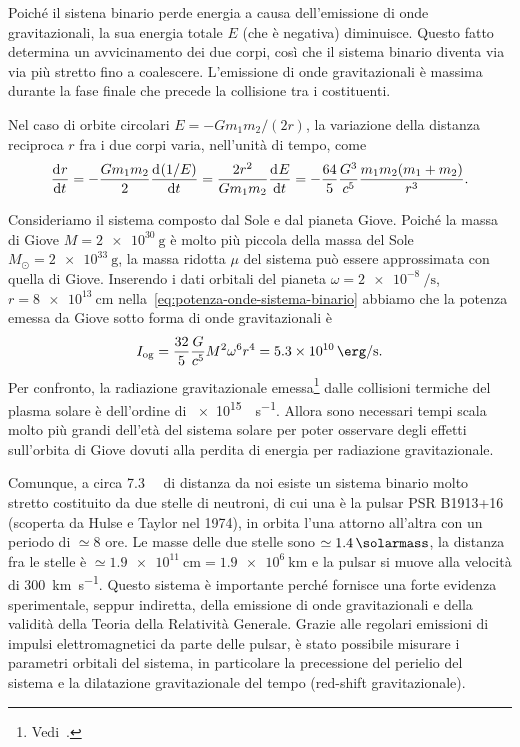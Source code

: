 Poiché il sistena binario perde energia a causa dell'emissione di onde
gravitazionali, la sua energia totale $E$ (che è negativa) diminuisce.  Questo
fatto determina un avvicinamento dei due corpi, così che il sistema binario
diventa via via più stretto fino a coalescere.  L'emissione di onde
gravitazionali è massima durante la fase finale che precede la collisione tra i
costituenti.

Nel caso di orbite circolari $E = -Gm_{1}m_{2}/(2r)$, la variazione della
distanza reciproca $r$ fra i due corpi varia, nell'unità di tempo, come
\begin{equation}
  \frac{{\mathop{}\!\mathrm{d}^{}}r}{\mathop{}\!\mathrm{d} {t}^{}} = -\frac{Gm_{1}m_{2}}{2} \frac{{\mathop{}\!\mathrm{d}^{}}(1/E)}{\mathop{}\!\mathrm{d} {t}^{}} =
  \frac{2r^{2}}{Gm_{1}m_{2}} \frac{{\mathop{}\!\mathrm{d}^{}}E}{\mathop{}\!\mathrm{d} {t}^{}} = -\frac{64}{5}\frac{G^{3}}{c^{5}}
  \frac{m_{1}m_{2}(m_{1} + m_{2})}{r^{3}}.
\end{equation}

Consideriamo il sistema composto dal Sole e dal pianeta Giove.  Poiché la massa
di Giove $M = \SI{2e30}{\gram}$ è molto più piccola della massa del Sole
$M_{\odot} = \SI{2e33}{\gram}$, la massa ridotta $\mu$ del sistema può essere
approssimata con quella di Giove.  Inserendo i dati orbitali del pianeta
$\omega = \SI[per-mode=reciprocal]{2e-8}{\per\second}$,
$r = \SI{8e13}{\centi\metre}$ nella~\eqref{eq:potenza-onde-sistema-binario}
abbiamo che la potenza emessa da Giove sotto forma di onde gravitazionali è
\begin{equation}
  I_{\textup{og}} = \frac{32}{5} \frac{G}{c^{5}} M^{2} \omega^{6} r^{4} =
  \SI{5.3e10}{\erg\per\second}.
\end{equation}
Per confronto, la radiazione gravitazionale
emessa\footnote{Vedi~\textcite[266]{weinberg:gravitation}.}  dalle collisioni
termiche del plasma solare è dell'ordine di \SI{e15}{\erg\per\second}.  Allora
sono necessari tempi scala molto più grandi dell'età del sistema solare per
poter osservare degli effetti sull'orbita di Giove dovuti alla perdita di
energia per radiazione gravitazionale.

Comunque, a circa \SI{7.3}{\kilo\parsec} di distanza da noi esiste un sistema
binario molto stretto costituito da due stelle di neutroni, di cui una è la
pulsar PSR B1913+16 (scoperta da Hulse e Taylor nel 1974), in orbita l'una
attorno all'altra con un periodo di $\simeq 8$ ore.  Le masse delle due stelle
sono $\simeq \SI{1.4}{\solarmass}$, la distanza fra le stelle è $\simeq
\SI{1.9e11}{\centi\metre} = \SI{1.9e6}{\kilo\metre}$ e la pulsar si muove alla
velocità di \SI{300}{\kilo\metre\per\second}.  Questo sistema è importante
perché fornisce una forte evidenza sperimentale, seppur indiretta, della
emissione di onde gravitazionali e della validità della Teoria della Relatività
Generale.  Grazie alle regolari emissioni di impulsi elettromagnetici da parte
delle pulsar, è stato possibile misurare i parametri orbitali del sistema, in
particolare la precessione del perielio del sistema e la dilatazione
gravitazionale del tempo (red-shift gravitazionale).

